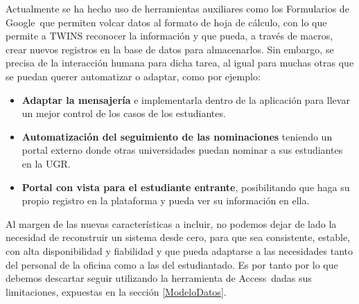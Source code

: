 Actualmente se ha hecho uso de herramientas auxiliares como los Formularios de Google\textregistered \ que permiten volcar datos al formato de hoja de cálculo, con lo que permite a TWINS reconocer la información y que pueda, a través de macros, crear nuevos registros en la base de datos para almacenarlos. Sin embargo, se precisa de la interacción humana para dicha tarea, al igual para muchas otras que se puedan querer automatizar o adaptar, como por ejemplo:

\begin{itemize}
	\item \textbf{Adaptar la mensajería} e implementarla dentro de la aplicación para llevar un mejor control de los casos de los estudiantes.
	\item \textbf{Automatización del seguimiento de las nominaciones} teniendo un portal externo donde otras universidades puedan nominar a sus estudiantes en la UGR.
	\item \textbf{Portal con vista para el estudiante entrante}, posibilitando que haga su propio registro en la plataforma y pueda ver su información en ella.
\end{itemize}

Al margen de las nuevas características a incluir, no podemos dejar de lado la necesidad de reconstruir un sistema desde cero, para que sea consistente, estable, con alta disponibilidad y fiabilidad y que pueda adaptarse a las necesidades tanto del personal de la oficina como a las del estudiantado. Es por tanto por lo que debemos descartar seguir utilizando la herramienta de Access\textregistered \ dadas sus limitaciones, expuestas en la sección \ref{ModeloDatos}.